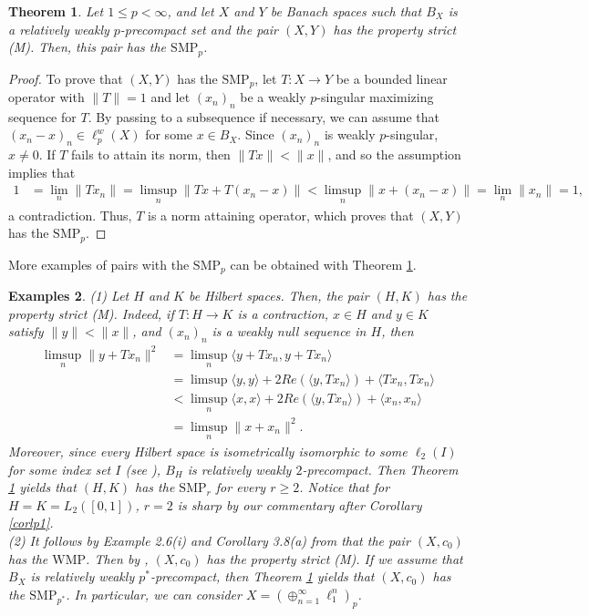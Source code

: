 \documentclass[12 pt]{article}%
\newtheorem{theorem}{Theorem}[section]
\newtheorem{examples}[theorem]{Examples}
\newtheorem{final remark}[theorem]{Final Remark}
\newcommand{\norma}[1]{\| #1 \|}
\newcommand{\inner}[2]{\langle {#1},{#2} \rangle}
\begin{document}
\begin{theorem} \label{more1}
Let $1 \leq p < \infty$, and let $X$ and $Y$ be Banach spaces such that  $B_X$ is a relatively weakly $p$-precompact set and the pair $(X, Y)$ has the property strict (M). Then, this pair has the $\mathrm{SMP}_p$.
\end{theorem} 

\begin{proof} To prove that $(X, Y)$ has the $\mathrm{SMP}_p$, let $T: X \to Y$ be a bounded linear operator with $\norma{T} = 1$ and let $(x_n)_n$ be a weakly $p$-singular maximizing sequence for $T$. By passing to a subsequence if necessary, we can assume that $(x_n - x)_n \in \ell_p^w(X)$ for some $x \in B_X$.
Since $(x_n)_n$ is weakly $p$-singular, $x \neq 0$. 
If $T$ fails to attain its norm, then $\norma{Tx} < \norma{x}$, and so the assumption implies that     \begin{align*}        1 & = \lim_n \norma{Tx_n} =  \limsup_{n} \norma{Tx + T(x_n-x)} < \limsup_{n} \norma{x+(x_n - x)} = \lim_n \norma{x_n} = 1,    \end{align*}    a contradiction. Thus, $T$ is a norm attaining operator, which proves that $(X, Y)$ has the $\mathrm{SMP}_p$.
\end{proof}

More examples of pairs with the $\mathrm{SMP}_p$ can be obtained with Theorem \ref{more1}.


\begin{examples}\rm {\rm (1)} Let $H$ and $K$ be Hilbert spaces. Then, the pair $(H, K)$ has the property strict (M). Indeed, if $T: H \to K$ is a contraction, $x \in H$ and $y \in K$ satisfy $\norma{y} <\norma{x}$, and $(x_{n})_{n}$ is a weakly null sequence in $H$, then 
\begin{align*}
    \limsup_{n}\norma{y + Tx_{n}}^{2}&=\limsup_{n}\inner{y+ Tx_{n}}{y + Tx_{n}} \\
        &=\limsup \inner{y}{y} + 2Re(\inner{y}{Tx_{n}})+ \inner{Tx_{n}}{Tx_{n}} \\
        &<\limsup_{n} \inner{x}{x}+ 2Re(\inner{y}{Tx_{n}})+ \inner{x_{n}}{x_{n}} \\
        &=\limsup_{n} \norma{x +x_{n}}^{2}.
\end{align*}
Moreover, since every Hilbert space is isometrically isomorphic to some $\ell_2(I)$ for some index set $I$ (see \cite[Exercise 5.8.13]{geraldo}), $B_H$ is relatively weakly $2$-precompact. Then Theorem \ref{more1} yields that $(H,K)$ has the $\mathrm{SMP}_r$ for every $r \geq 2$. Notice that for $H = K = L_2([0,1])$, $r = 2$ is sharp by our commentary after Corollary \ref{corlp1}.\\
{\rm (2)} It follows by Example 2.6(i) and Corollary 3.8(a) from \cite{garcia-lirola} that the pair $(X, c_0)$ has the $\mathrm{WMP}$. Then by \cite[Theorem 13]{han}, $(X, c_0)$ has the property strict (M). If we assume that $B_X$ is relatively weakly $p^*$-precompact, then Theorem \ref{more1} yields that $(X,c_{0})$ has the $\mathrm{SMP}_{p^*}$. In particular, we can consider $X = (\oplus_{n=1}^\infty \ell_1^n)_p$.
\end{examples}
\end{document}
